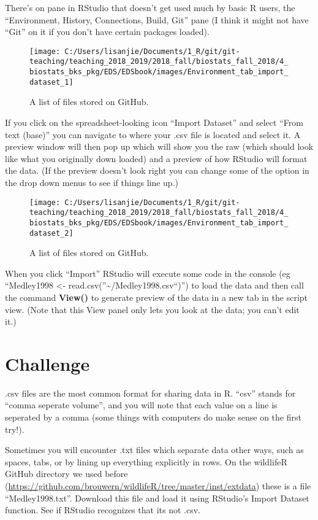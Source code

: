 \documentclass[]{book}
\theoremstyle{definition}
\theoremstyle{definition}
\theoremstyle{definition}
\theoremstyle{remark}
\begin{document}
There's on pane in RStudio that doesn't get used much by basic R users,
the ``Environment, History, Connections, Build, Git'' pane (I think it
might not have ``Git'' on it if you don't have certain packages loaded).

\begin{figure}
\texttt{[image: C:/Users/lisanjie/Documents/1\_R/git/git-teaching/teaching\_2018\_2019/2018\_fall/biostats\_fall\_2018/4\_biostats\_bks\_pkg/EDS/EDSbook/images/Environment\_tab\_import\_dataset\_1]} \caption{A list of files stored on GitHub.}\label{fig:unnamed-chunk-111}
\end{figure}

If you click on the spreadsheet-looking icon ``Import Dataset'' and
select ``From text (base)'' you can navigate to where your .csv file is
located and select it. A preview window will then pop up which will show
you the raw (which should look like what you originally down loaded) and
a preview of how RStudio will format the data. (If the preview doesn't
look right you can change some of the option in the drop down menus to
see if things line up.)

\begin{figure}
\texttt{[image: C:/Users/lisanjie/Documents/1\_R/git/git-teaching/teaching\_2018\_2019/2018\_fall/biostats\_fall\_2018/4\_biostats\_bks\_pkg/EDS/EDSbook/images/Environment\_tab\_import\_dataset\_2]} \caption{A list of files stored on GitHub.}\label{fig:unnamed-chunk-112}
\end{figure}

When you click ``Import'' RStudio will execute some code in the console
(eg ``Medley1998 \textless{}-
read.csv(''\textasciitilde{}/Medley1998.csv``)'') to load the data and
then call the command \textbf{View()} to generate preview of the data in
a new tab in the script view. (Note that this View panel only lets you
look at the data; you can't edit it.)

\section{Challenge}\label{challenge-1}

.csv files are the most common format for sharing data in R. ``csv''
stands for ``comma seperate volume'', and you will note that each value
on a line is seperated by a comma (some things with computers do make
sense on the first try!).

Sometimes you will encounter .txt files which separate data other ways,
such as spaces, tabs, or by lining up everything explicitly in rows. On
the wildlifeR GitHub directory we used before
(\url{https://github.com/brouwern/wildlifeR/tree/master/inst/extdata})
these is a file ``Medley1998.txt''. Download this file and load it using
RStudio's Import Dataset function. See if RStudio recognizes that its
not .csv.
\end{document}
